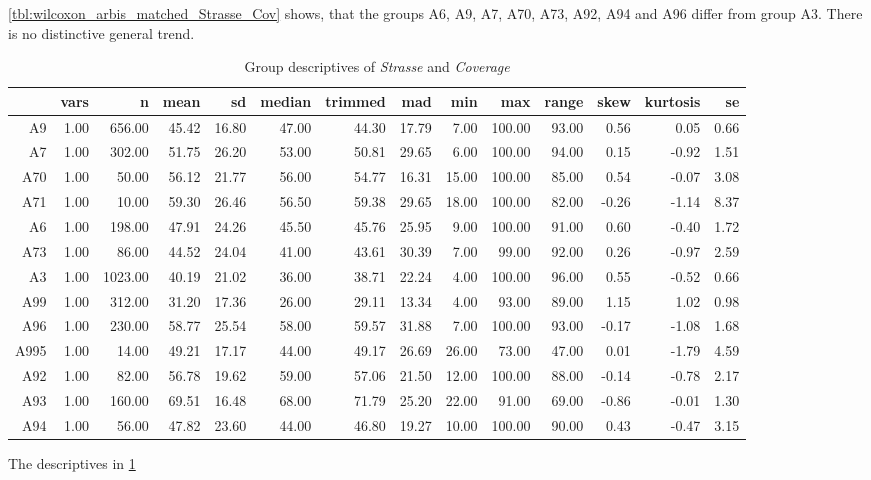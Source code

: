 \cref{tbl:wilcoxon_arbis_matched_Strasse_Cov} shows, that the groups A6, A9, A7, A70, A73, A92, A94 and A96 differ from group A3. There is no distinctive general trend.
\begin{table}[ht!]
	\tiny
	\centering
  \begin{tabular}{rrrrrrrrrrrrrr}
    \hline
    & vars & n & mean & sd & median & trimmed & mad & min & max & range & skew & kurtosis & se \\ 
    \hline
    A9   & 1.00 & 656.00 & 45.42 & 16.80 & 47.00 & 44.30 & 17.79 & 7.00 & 100.00 & 93.00 & 0.56 & 0.05 & 0.66 \\ 
    A7   & 1.00 & 302.00 & 51.75 & 26.20 & 53.00 & 50.81 & 29.65 & 6.00 & 100.00 & 94.00 & 0.15 & -0.92 & 1.51 \\ 
    A70  & 1.00 & 50.00 & 56.12 & 21.77 & 56.00 & 54.77 & 16.31 & 15.00 & 100.00 & 85.00 & 0.54 & -0.07 & 3.08 \\ 
    A71  & 1.00 & 10.00 & 59.30 & 26.46 & 56.50 & 59.38 & 29.65 & 18.00 & 100.00 & 82.00 & -0.26 & -1.14 & 8.37 \\ 
    A6   & 1.00 & 198.00 & 47.91 & 24.26 & 45.50 & 45.76 & 25.95 & 9.00 & 100.00 & 91.00 & 0.60 & -0.40 & 1.72 \\ 
    A73  & 1.00 & 86.00 & 44.52 & 24.04 & 41.00 & 43.61 & 30.39 & 7.00 & 99.00 & 92.00 & 0.26 & -0.97 & 2.59 \\ 
    A3   & 1.00 & 1023.00 & 40.19 & 21.02 & 36.00 & 38.71 & 22.24 & 4.00 & 100.00 & 96.00 & 0.55 & -0.52 & 0.66 \\ 
    A99  & 1.00 & 312.00 & 31.20 & 17.36 & 26.00 & 29.11 & 13.34 & 4.00 & 93.00 & 89.00 & 1.15 & 1.02 & 0.98 \\ 
    A96  & 1.00 & 230.00 & 58.77 & 25.54 & 58.00 & 59.57 & 31.88 & 7.00 & 100.00 & 93.00 & -0.17 & -1.08 & 1.68 \\ 
    A995 & 1.00 & 14.00 & 49.21 & 17.17 & 44.00 & 49.17 & 26.69 & 26.00 & 73.00 & 47.00 & 0.01 & -1.79 & 4.59 \\ 
    A92  & 1.00 & 82.00 & 56.78 & 19.62 & 59.00 & 57.06 & 21.50 & 12.00 & 100.00 & 88.00 & -0.14 & -0.78 & 2.17 \\ 
    A93  & 1.00 & 160.00 & 69.51 & 16.48 & 68.00 & 71.79 & 25.20 & 22.00 & 91.00 & 69.00 & -0.86 & -0.01 & 1.30 \\ 
    A94  & 1.00 & 56.00 & 47.82 & 23.60 & 44.00 & 46.80 & 19.27 & 10.00 & 100.00 & 90.00 & 0.43 & -0.47 & 3.15 \\ 
    \hline
  \end{tabular}
	\caption{Group descriptives of \textit{Strasse} and \textit{Coverage}}
	\label{tbl:descriptives_arbis_matched_Strasse_Cov}
\end{table}
The descriptives in \cref{tbl:descriptives_arbis_matched_Strasse_Cov}

